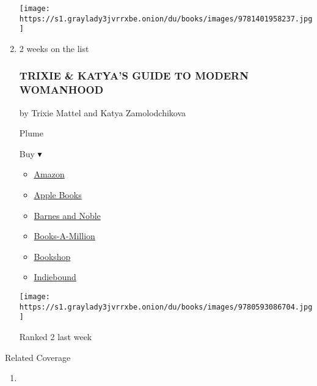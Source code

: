 \begin{enumerate}
  \texttt{[image: https://s1.graylady3jvrrxbe.onion/du/books/images/9781401958237.jpg]}
\item
  2 weeks on the list

  \hypertarget{trixie--katyas-guide-to-modern-womanhood}{%
  \subsubsection{TRIXIE \& KATYA'S GUIDE TO MODERN
  WOMANHOOD}\label{trixie--katyas-guide-to-modern-womanhood}}

  by Trixie Mattel and Katya Zamolodchikova

  Plume

  Buy ▾

  \begin{itemize}
  \tightlist
  \item
    \href{https://www.amazon.com/dp/0593086708?tag=NYTBSREV-20\&tag=NYTBS-20}{Amazon}
  \item
    \href{https://du-gae-books-dot-nyt-du-prd.appspot.com/buy?title=TRIXIE+\%26+KATYA\%27S+GUIDE+TO+MODERN+WOMANHOOD\&author=Trixie+Mattel+and+Katya+Zamolodchikova}{Apple
    Books}
  \item
    \href{https://www.anrdoezrs.net/click-7990613-11819508?url=https\%3A\%2F\%2Fwww.barnesandnoble.com\%2Fw\%2F\%3Fean\%3D9780593086704}{Barnes
    and Noble}
  \item
    \href{https://www.anrdoezrs.net/click-7990613-35140?url=https\%3A\%2F\%2Fwww.booksamillion.com\%2Fp\%2FTRIXIE\%2B\%2526\%2BKATYA\%2527S\%2BGUIDE\%2BTO\%2BMODERN\%2BWOMANHOOD\%2FTrixie\%2BMattel\%2Band\%2BKatya\%2BZamolodchikova\%2F9780593086704}{Books-A-Million}
  \item
    \href{https://bookshop.org/a/3546/9780593086704}{Bookshop}
  \item
    \href{https://www.indiebound.org/book/9780593086704?aff=NYT}{Indiebound}
  \end{itemize}

  \texttt{[image: https://s1.graylady3jvrrxbe.onion/du/books/images/9780593086704.jpg]}

  Ranked 2 last week
\end{enumerate}

Related Coverage

\begin{enumerate}
\def\labelenumi{\arabic{enumi}.}
\tightlist
\item
  \href{https://www.nytimes3xbfgragh.onion/2020/07/31/books/review/the-system-robert-reich-break-em-up-zephyr-teachout.html}{}
\end{enumerate}

